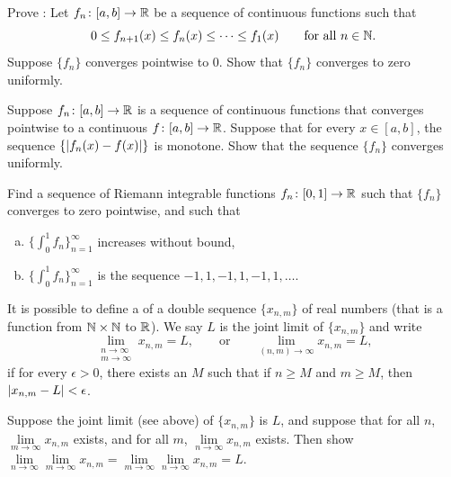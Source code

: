 \begin{exercise}[Hard] \label{exercise:dinisthm}
Prove \emph{}:
Let $f_n \colon [a,b] \to {\mathbb{R}}$ be a sequence of continuous functions such that
\begin{equation*}
0 \leq f_{n+1}(x) \leq f_n(x) \leq \cdots \leq f_1(x) 
\qquad \text{for all } n \in {\mathbb{N}}.
\end{equation*}
Suppose $\{ f_n \}$ converges pointwise to $0$.
Show that $\{ f_n \}$ converges to zero uniformly.
\end{exercise}

\begin{exercise}
Suppose $f_n \colon [a,b] \to {\mathbb{R}}$ is a sequence of continuous
functions that
converges pointwise
to a continuous $f \colon [a,b] \to {\mathbb{R}}$.  Suppose that
for every $x \in [a,b]$, the sequence $\{ \left\lvert {f_n(x)-f(x)} \right\rvert \}$ is monotone.
Show that the sequence $\{f_n\}$ converges uniformly.
\end{exercise}

\begin{exercise}
Find a sequence of Riemann integrable functions $f_n \colon [0,1] \to {\mathbb{R}}$ such
that $\{ f_n \}$ converges to zero pointwise, and such that
\begin{enumerate}[a)]
\item
$\bigl\{ \int_0^1 f_n \bigr\}_{n=1}^\infty$ increases without bound,
\item
$\bigl\{ \int_0^1 f_n \bigr\}_{n=1}^\infty$ is the sequence $-1,1,-1,1,-1,1, \ldots$.
\end{enumerate}
\end{exercise}

\begin{exnote}
It is possible to define a 
\emph{} of a double sequence $\{ x_{n,m} \}$ of real
numbers (that is a function from ${\mathbb{N}} \times {\mathbb{N}}$ to ${\mathbb{R}}$).
We say $L$ is the joint limit of $\{ x_{n,m} \}$ and write
\begin{equation*}
\lim_{\substack{n\to\infty\\m\to\infty}}
x_{n,m} = L ,
\qquad
\text{or}
\qquad
\lim_{(n,m) \to \infty}
x_{n,m} = L ,
\end{equation*}
if for every $\epsilon > 0$, there
exists an $M$ such that if $n \geq M$ and $m \geq M$, then
$\left\lvert {x_{n,m} - L} \right\rvert < \epsilon$.
\end{exnote}

\begin{exercise}
Suppose the joint limit (see above) of $\{ x_{n,m} \}$ is $L$, and suppose
that for all $n$, $\lim\limits_{m \to \infty} x_{n,m}$ exists,
and for all $m$, $\lim\limits_{n \to \infty} x_{n,m}$ exists.  Then show
$\lim\limits_{n\to\infty}\lim\limits_{m \to \infty} x_{n,m}
=
\lim\limits_{m\to\infty}\lim\limits_{n \to \infty} x_{n,m} = L$.
\end{exercise}

